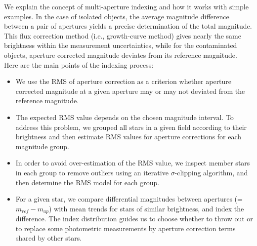 We explain the concept of multi-aperture indexing and how it works with simple examples.  In the case of isolated objects, the average magnitude difference between a pair of apertures yields a precise determination of the total magnitude.  This flux correction method (i.e., growth-curve method) gives nearly the same brightness within the measurement uncertainties, while for the contaminated objects, aperture corrected magnitude deviates from its reference magnitude.    Here are the main points of the indexing process: \begin{itemize}
\item{We use the RMS of aperture correction as a criterion whether aperture corrected magnitude at a given aperture may or may not deviated from the reference magnitude.}

\item{The expected RMS value depends on the chosen magnitude interval.  To address this problem, we grouped all stars in a given field according to their brightness and then estimate RMS values for aperture corrections for each magnitude group.}

\item{In order to avoid over-estimation of the RMS value, we inspect member stars in each group to remove outliers using an iterative $\sigma$-clipping algorithm, and then determine the RMS model for each group.}

\item{For a given star, we compare differential magnitudes between apertures (=$m_{ref}-m_{ap}$) with mean trends for stars of similar brightness, and index the difference.  The index distribution guides us to choose whether to throw out or to replace some photometric measurements by aperture correction terms shared by other stars.}
\end{itemize}

